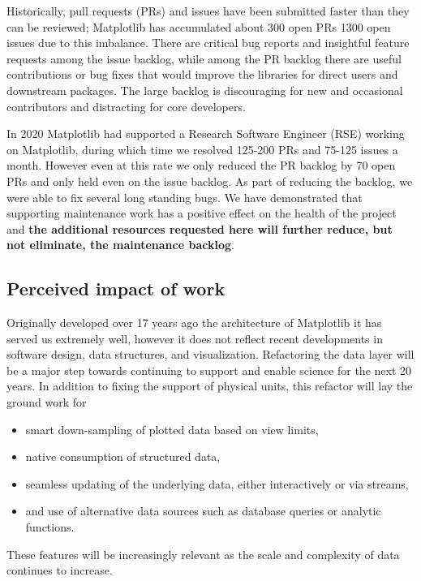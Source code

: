 \documentclass[12pt]{article}
\numberwithin{page}{section}
\begin{document}





Historically, pull requests (PRs) and issues have been submitted
faster than they can be reviewed; Matplotlib has accumulated about 300
open PRs 1300 open issues due to this imbalance. There are critical bug reports and insightful feature requests among
the issue backlog, while among the PR backlog there are useful contributions
or bug fixes that would improve the libraries for direct users and
downstream packages.  The large backlog is discouraging for new and
occasional contributors and distracting for core developers.

In 2020 Matplotlib had supported a Research Software Engineer (RSE)
working on Matplotlib, during which time we resolved 125-200 PRs and
75-125 issues a month.  However even at this rate we only reduced the
PR backlog by 70 open PRs and only held even on the issue backlog.  As
part of reducing the backlog, we were able to fix several long
standing bugs.  We have demonstrated that supporting maintenance work
has a positive effect on the health of the project and \textbf{the
  additional resources requested here will further reduce, but not
  eliminate, the maintenance backlog}.



\subsection{Perceived impact of work}
\label{sec:piw}

Originally developed over 17 years ago the architecture of Matplotlib
it has served us extremely well, however it does not reflect recent
developments in software design, data structures, and visualization.
Refactoring the data layer will be a major step towards continuing to
support and enable science for the next 20 years.  In addition to fixing
the support of physical units, this refactor will lay the ground work for
\begin{itemize}[noitemsep]
  \item smart down-sampling of plotted data based on view limits,
  \item native consumption of structured data,
  \item seamless updating of the underlying data, either interactively
    or via streams,
  \item and use of alternative data sources such as database queries
    or analytic functions.
\end{itemize}
These features will be increasingly relevant as the scale and complexity
of data continues to increase.
\end{document}
